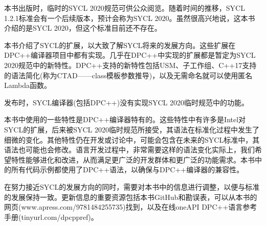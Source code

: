 本书出版时，临时的SYCL 2020规范可供公众阅览。随着时间的推移，SYCL 1.2.1标准会有一个后续版本，预计会称为SYCL 2020。虽然很高兴地说，这本书介绍的是SYCL 2020，但这个标准目前还不存在。\par

本书介绍了SYCL的扩展，以大致了解SYCL将来的发展方向。这些扩展在DPC++编译器项目中都有实现。几乎在DPC++中实现的扩展都是暂定为SYCL 2020规范中的新特性。DPC++支持的新特性包括USM、子工作组、C++17支持的语法简化(称为CTAD——class模板参数推导)，以及无需命名就可以使用匿名Lambda函数。\par

发布时，SYCL编译器(包括DPC++)没有实现SYCL 2020临时规范中的功能。\par

本书中使用的一些特性是DPC++编译器特有的。这些特性中有许多是Intel对SYCL的扩展，后来被SYCL 2020临时规范所接受，其语法在标准化过程中发生了细微的变化。其他特性仍在开发或讨论中，可能会包含在未来的SYCL标准中，其语法也可能也会修改。语言开发过程中，非常需要这样的语法变化实际上，我们希望特性能够进化和改进，从而满足更广泛的开发群体和更广泛的功能需求。本书中的所有代码示例都使用了DPC++语法，以确保与DPC++编译器的兼容性。\par

在努力接近SYCL的发展方向的同时，需要对本书中的信息进行调整，以便与标准的发展保持一致。更新信息的重要资源包括本书GitHub和勘误表，可以从本书的网页(www.apress.com/9781484255735)找到，以及在线oneAPI DPC++语言参考手册(tinyurl.com/dpcppref)。\par

















